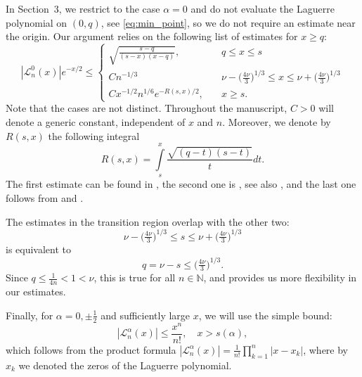\documentclass[11pt]{amsart}
\numberwithin{equation}{section}
\newcommand{\N}{{\mathbb N}}
\begin{document}
In Section~3, we restrict to the case $\alpha=0$ and do not evaluate the Laguerre polynomial on $(0,q)$, see \eqref{eq:min_point}, so we do not require an estimate near the origin.
Our argument relies on the following list of estimates for $x\geq q$:
\begin{equation}\label{eq:estimate}
    |\mathcal{L}^{0}_n(x)|e^{-x/2}\leq \begin{cases}
        \sqrt{\frac{s-q}{(s-x)(x-q)}}, &\quad  q\leq x\leq s\\
        C n^{-1/3} &\quad  \nu -\big(\tfrac{4\nu}{3}\big)^{1/3} \leq x\leq \nu +\big(\tfrac{4\nu}{3}\big)^{1/3} \\
        C x^{-1/2} n^{1/6} e^{-R(s,x)/2}, &\quad  x\geq s.
    \end{cases}
\end{equation}
Note that the cases are not distinct. Throughout the manuscript, $C > 0$ will denote a generic constant, independent of $x$ and $n$. Moreover, we denote by $R(s,x)$  the following integral
\begin{equation}
    R(s, x) = \int\limits_{s}^{x} \frac{\sqrt{(q-t)(s-t)}}{t} dt.
\end{equation}
The first estimate can be found in \cite[Thm.~3]{MR2168916}, the second one is \cite[Eq.~40]{Tricomi1949}, see also \cite[Sec.~10.15.]{HighTransFcts1981}, and the last one follows from \cite[Thm.~2]{MR2287374} and \cite[Thm.~5]{MR2287374}.

The estimates in the transition region overlap with the other two:
\begin{equation}
     \nu -\big(\tfrac{4\nu}{3}\big)^{1/3} \leq s \leq \nu +\big(\tfrac{4\nu}{3}\big)^{1/3}
\end{equation}
is equivalent to 
\begin{equation}
    q = \nu - s \leq \big(\tfrac{4\nu}{3}\big)^{1/3}.
\end{equation}
Since $q\leq \tfrac{1}{4n}<1<\nu$, this is true for all $n\in\N$, and provides us more flexibility in our estimates.

Finally, for $\alpha=0, \pm \tfrac{1}{2}$ and sufficiently large $x$, we will use the simple bound:
\begin{equation}\label{eq:x_n_n_factorial_bound}
    |\mathcal{L}^{\alpha}_n(x)| \leq \frac{x^n}{n!}, \quad x>s(\alpha),
\end{equation}
which follows from the product formula $|\mathcal{L}^{\alpha}_n(x)| = \frac{1}{n!}\prod\limits_{k=1}^n|x-x_k|$, where by $x_k$ we denoted the zeros of the Laguerre polynomial.
\end{document}
